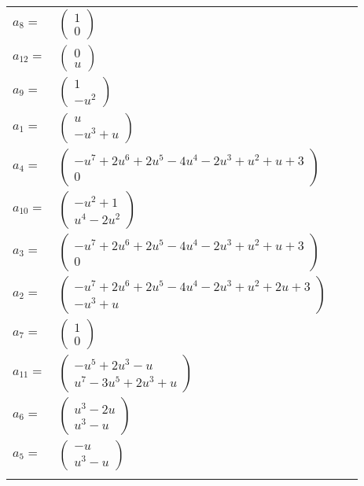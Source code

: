 \documentclass[1p]{elsarticle_modified}
\theoremstyle{definition}
\begin{document}
\begin{tabular}{m{7pt} m{180pt} m{7pt} m{180pt} }
\flushright $a_{8}=$&$\begin{pmatrix}1\\0\end{pmatrix}$ \\
\flushright $a_{12}=$&$\begin{pmatrix}0\\u\end{pmatrix}$ \\
\flushright $a_{9}=$&$\begin{pmatrix}1\\- u^2\end{pmatrix}$ \\
\flushright $a_{1}=$&$\begin{pmatrix}u\\- u^3+u\end{pmatrix}$ \\
\flushright $a_{4}=$&$\begin{pmatrix}- u^7+2 u^6+2 u^5-4 u^4-2 u^3+u^2+u+3\\0\end{pmatrix}$ \\
\flushright $a_{10}=$&$\begin{pmatrix}- u^2+1\\u^4-2 u^2\end{pmatrix}$ \\
\flushright $a_{3}=$&$\begin{pmatrix}- u^7+2 u^6+2 u^5-4 u^4-2 u^3+u^2+u+3\\0\end{pmatrix}$ \\
\flushright $a_{2}=$&$\begin{pmatrix}- u^7+2 u^6+2 u^5-4 u^4-2 u^3+u^2+2 u+3\\- u^3+u\end{pmatrix}$ \\
\flushright $a_{7}=$&$\begin{pmatrix}1\\0\end{pmatrix}$ \\
\flushright $a_{11}=$&$\begin{pmatrix}- u^5+2 u^3- u\\u^7-3 u^5+2 u^3+u\end{pmatrix}$ \\
\flushright $a_{6}=$&$\begin{pmatrix}u^3-2 u\\u^3- u\end{pmatrix}$ \\
\flushright $a_{5}=$&$\begin{pmatrix}- u\\u^3- u\end{pmatrix}$\\&\end{tabular}
\end{document}
